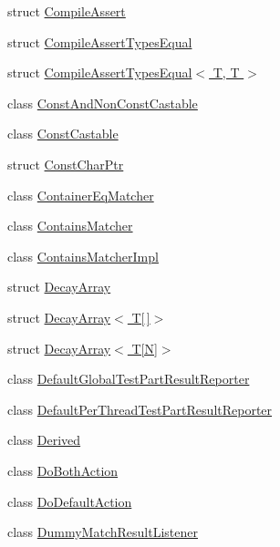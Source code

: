 \begin{DoxyCompactItemize}
\item 
struct \hyperlink{structtesting_1_1internal_1_1_compile_assert}{Compile\+Assert}
\item 
struct \hyperlink{structtesting_1_1internal_1_1_compile_assert_types_equal}{Compile\+Assert\+Types\+Equal}
\item 
struct \hyperlink{structtesting_1_1internal_1_1_compile_assert_types_equal_3_01_t_00_01_t_01_4}{Compile\+Assert\+Types\+Equal$<$ T, T $>$}
\item 
class \hyperlink{classtesting_1_1internal_1_1_const_and_non_const_castable}{Const\+And\+Non\+Const\+Castable}
\item 
class \hyperlink{classtesting_1_1internal_1_1_const_castable}{Const\+Castable}
\item 
struct \hyperlink{structtesting_1_1internal_1_1_const_char_ptr}{Const\+Char\+Ptr}
\item 
class \hyperlink{classtesting_1_1internal_1_1_container_eq_matcher}{Container\+Eq\+Matcher}
\item 
class \hyperlink{classtesting_1_1internal_1_1_contains_matcher}{Contains\+Matcher}
\item 
class \hyperlink{classtesting_1_1internal_1_1_contains_matcher_impl}{Contains\+Matcher\+Impl}
\item 
struct \hyperlink{structtesting_1_1internal_1_1_decay_array}{Decay\+Array}
\item 
struct \hyperlink{structtesting_1_1internal_1_1_decay_array_3_01_t[]_4}{Decay\+Array$<$ T\mbox{[}$\,$\mbox{]}$>$}
\item 
struct \hyperlink{structtesting_1_1internal_1_1_decay_array_3_01_t[_n]_4}{Decay\+Array$<$ T\mbox{[}\+N\mbox{]}$>$}
\item 
class \hyperlink{classtesting_1_1internal_1_1_default_global_test_part_result_reporter}{Default\+Global\+Test\+Part\+Result\+Reporter}
\item 
class \hyperlink{classtesting_1_1internal_1_1_default_per_thread_test_part_result_reporter}{Default\+Per\+Thread\+Test\+Part\+Result\+Reporter}
\item 
class \hyperlink{classtesting_1_1internal_1_1_derived}{Derived}
\item 
class \hyperlink{classtesting_1_1internal_1_1_do_both_action}{Do\+Both\+Action}
\item 
class \hyperlink{classtesting_1_1internal_1_1_do_default_action}{Do\+Default\+Action}
\item 
class \hyperlink{classtesting_1_1internal_1_1_dummy_match_result_listener}{Dummy\+Match\+Result\+Listener}

\end{DoxyCompactItemize}

